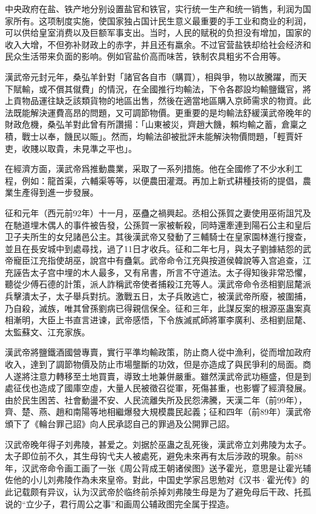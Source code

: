 中央政府在盐、铁产地分别设置盐官和铁官，实行统一生产和统一销售，利润为国家所有。这项制度实施，使国家独占国计民生意义最重要的手工业和商业的利润，可以供给皇室消费以及巨额军事支出。当时，人民的赋税的负担没有增加，国家的收入大增，不但弥补财政上的赤字，并且还有羸余。不过官营盐铁却给社会经济和民众生活带来负面的影响。例如官盐价高而味苦，铁制农具粗劣不合用等。

漢武帝元封元年，桑弘羊針對「諸官各自市（購買），相與爭，物以故騰躍，而天下賦輸，或不償其僦費」的情況，在全國推行均輸法，下令各郡設均輸鹽鐵官，將上貢物品運往缺乏該類貨物的地區出售，然後在適當地區購入京師需求的物資。此法既能解決運費高昂的問題，又可調節物價。更重要的是均輸法舒緩漢武帝晚年的財政危機，桑弘羊對此曾有所讚揚：「山東被災，齊趙大饑，賴均輸之蓄，倉稟之積，戰士以奉，饑民以賑」。然而，均輸法卻被批評未能解決物價問題，「輕賈奸吏，收賤以取貴，未見準之平也」。

在經濟方面，漢武帝爲推動農業，采取了一系列措施。他在全國修了不少水利工程，例如：龍首渠，六輔渠等等，以便農田灌溉。再加上新式耕種技術的提倡，農業生產得到進一步發展。

征和元年（西元前92年）十一月，巫蠱之禍興起。丞相公孫賀之妻使用巫術詛咒及在馳道埋木偶人的事件被告發，公孫賀一家被斬殺，同時還牽連到陽石公主和皇后卫子夫所生的女兒諸邑公主。其後漢武帝又發動了三輔騎士在皇家園林進行搜查，並且在長安城中到處尋找，過了11日才收兵。征和二年七月，與太子劉據結怨的武帝寵臣江充指使胡巫，說宫中有蠱氣。武帝命令江充與按道侯韓說等入宫追查，江充誣告太子宫中埋的木人最多，又有帛書，所言不守道法。太子得知後非常恐懼，聽從少傅石德的計策，派人詐稱武帝使者捕殺江充等人。漢武帝命令丞相劉屈氂派兵擊潰太子，太子舉兵對抗。激戰五日，太子兵敗逃亡，被漢武帝所廢，被圍捕，乃自殺，滅族，唯其曾孫劉病已得親信保全。征和三年，此謀反案的根源巫蛊案真相漸明，大臣上书直言进谏，武帝感悟，下令族滅貳師將軍李廣利、丞相劉屈氂、太監蘇文、江充家族。

漢武帝將鹽鐵酒國營專賣，實行平準均輸政策，防止商人從中漁利，從而增加政府收入，達到了調節物價及防止市場壟斷的功效，但是亦造成了與民爭利的局面。商人遂將注意力轉移至土地買賣，導致土地兼併嚴重。雖然漢武帝武功極盛，但是到處征伐也造成了國庫空虛，大量人民被徵召從軍，死傷甚重，也影響了經濟發展。由於民生困苦、社會動盪不安、人民流離失所及民怨沸騰，天漢二年（前99年），齊、楚、燕、趙和南陽等地相繼爆發大規模農民起義；征和四年（前89年）漢武帝頒下了《輪台罪己詔》向人民承認自己的罪過及公開罪己詔。

汉武帝晚年得子刘弗陵，甚爱之。刘据於巫蛊之乱死後，漢武帝立刘弗陵为太子。太子即位前不久，其生母钩弋夫人被處死，避免未來再有太后涉政的現象。前88年，汉武帝命令画工画了一张《周公背成王朝诸侯图》送予霍光，意思是让霍光辅佐他的小儿刘弗陵作為未來皇帝。對此，中国史学家吕思勉对《汉书·霍光传》的此记载颇有异议，认为汉武帝於临终前杀掉刘弗陵生母是为了避免母后干政、托孤说的“立少子，君行周公之事”和画周公辅政图完全属于捏造。

